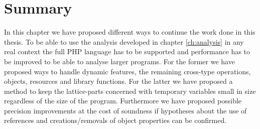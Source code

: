 \section{Summary}
In this chapter we have proposed different ways to continue the work done in this thesis. To be able to use the analysis developed in chapter \ref{ch:analysis} in any real context the full PHP language has to be supported and performance has to be improved to be able to analyse larger programs. For the former we have proposed ways to handle dynamic features, the remaining cross-type operations, objects, resources and library functions. For the latter we have proposed a method to keep the lattice-parts concerned with temporary variables small in size regardless of the size of the program. Furthermore we have proposed possible precision improvements at the cost of soundness if hypotheses about the use of references and creations/removals of object properties can be confirmed.  